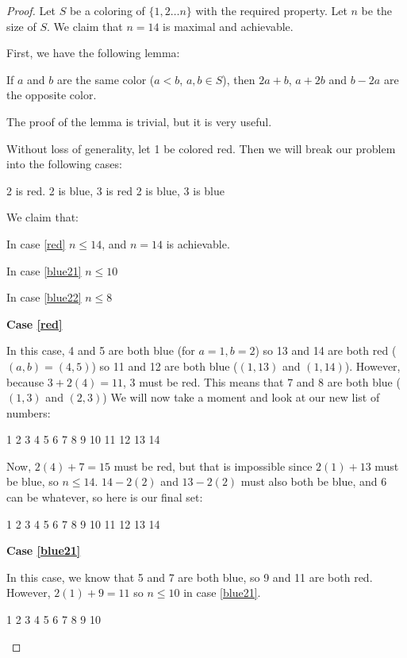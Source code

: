 \documentclass[a4paper,12pt]{scrartcl}
\newcommand{\red}{\color{red}}
\newcommand{\blue}{\color{blue}}
\newcommand{\black}{\color{black}}
\begin{document}
\begin{proof}
	Let $S$ be a coloring of $\{1,2\dots n\}$ with the required property.
Let $n$ be the size of $S$. We claim that $n=14$ is maximal and achievable.

First, we have the following lemma:
\begin{lemma*}
	If $a$ and $b$ are the same color ($a<b$, $a,b \in S$), 
	then $2a+b$, $a+2b$ and $b - 2a$ are the opposite color.
\end{lemma*}
The proof of the lemma is trivial, but it is very useful.

Without loss of generality, let 1 be colored red.
Then we will break our problem into the following cases:

\proofcase\label{red} 2 is red.
\proofcase\label{blue21} 2 is blue, 3 is red
\proofcase\label{blue22} 2 is blue, 3 is blue
\bigskip

We claim that:

In case \ref{red} $n \leq 14$, and $n=14$ is achievable.

In case \ref{blue21} $n \leq 10$

In case \ref{blue22} $n \leq 8$

\textbf{Case \ref{red}}

In this case, 4 and 5 are both blue (for $a=1, b=2$)
so 13 and 14 are both red ($(a,b) = (4,5)$)
so 11 and 12 are both blue ($(1,13)$ and $(1,14)$).
However, because $3 + 2(4) = 11$, 3 must be red. 
This means that 7 and 8 are both blue ($(1,3)$ and $(2,3)$)
We will now take a moment and look at our new list of numbers:
\begin{center}
	\red 1 2 3 \blue 4 5 \black 6 \blue 
	7 8 \black 9 10 \blue 11 12 \red 13 14
\end{center}
Now, $2(4) + 7 = 15$ must be red, but that is impossible since
$2(1) + 13$ must be blue, so $n \leq 14$.
$14 - 2(2)$ and $13 - 2(2)$ must also both be blue, and 6 can be whatever,
so here is our final set:
\begin{center}
	\red 1 2 3 \blue 4 5 \color{violet} 6 \blue 
	7 8 9 10 11 12 \red 13 14
\end{center}

\textbf{Case \ref{blue21}}

In this case, we know that 5 and 7 are both blue, so 9 and 11 are both red.
However, $2(1) + 9 = 11$ so $n \leq 10$ in case \ref{blue21}.
\begin{center}
	\red 1 \blue 2 \red 3 \black 4 \blue 5 \black 6 \blue 7 \black 8 
	\red 9 \black 10
\end{center}


\end{proof}
\end{document}
